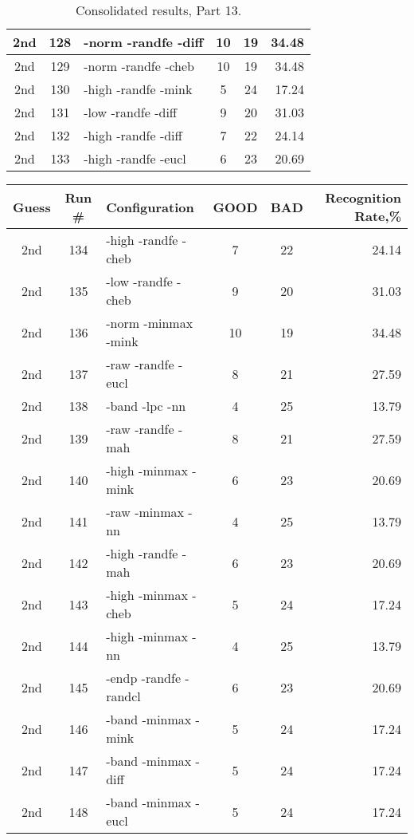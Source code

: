 \begin{table}
\begin{minipage}[b]{\textwidth}
\begin{tabular}{|c|c|l|c|c|r|}
2nd & 128 & -norm -randfe -diff  & 10 & 19 & 34.48\\ \hline
2nd & 129 & -norm -randfe -cheb  & 10 & 19 & 34.48\\ \hline
2nd & 130 & -high -randfe -mink  & 5 & 24 & 17.24\\ \hline
2nd & 131 & -low -randfe -diff  & 9 & 20 & 31.03\\ \hline
2nd & 132 & -high -randfe -diff  & 7 & 22 & 24.14\\ \hline
2nd & 133 & -high -randfe -eucl  & 6 & 23 & 20.69\\ \hline
\end{tabular}
\end{minipage}
\caption{Consolidated results, Part 13.}
\label{tab:results13}
\end{table}

\begin{table}
\begin{minipage}[b]{\textwidth}
\centering
\begin{tabular}{|c|c|l|c|c|r|} \hline
Guess & Run \# & Configuration & GOOD & BAD & Recognition Rate,\%\\ \hline\hline
2nd & 134 & -high -randfe -cheb  & 7 & 22 & 24.14\\ \hline
2nd & 135 & -low -randfe -cheb  & 9 & 20 & 31.03\\ \hline
2nd & 136 & -norm -minmax -mink  & 10 & 19 & 34.48\\ \hline
2nd & 137 & -raw -randfe -eucl  & 8 & 21 & 27.59\\ \hline
2nd & 138 & -band -lpc -nn  & 4 & 25 & 13.79\\ \hline
2nd & 139 & -raw -randfe -mah  & 8 & 21 & 27.59\\ \hline
2nd & 140 & -high -minmax -mink  & 6 & 23 & 20.69\\ \hline
2nd & 141 & -raw -minmax -nn  & 4 & 25 & 13.79\\ \hline
2nd & 142 & -high -randfe -mah  & 6 & 23 & 20.69\\ \hline
2nd & 143 & -high -minmax -cheb  & 5 & 24 & 17.24\\ \hline
2nd & 144 & -high -minmax -nn  & 4 & 25 & 13.79\\ \hline
2nd & 145 & -endp -randfe -randcl  & 6 & 23 & 20.69\\ \hline
2nd & 146 & -band -minmax -mink  & 5 & 24 & 17.24\\ \hline
2nd & 147 & -band -minmax -diff  & 5 & 24 & 17.24\\ \hline
2nd & 148 & -band -minmax -eucl  & 5 & 24 & 17.24\\ \hline

\end{tabular}
\end{minipage}
\end{table}
